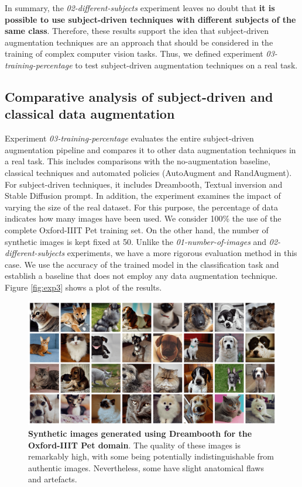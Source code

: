 In summary, the \textit{02-different-subjects} experiment leaves no doubt that \textbf{it is possible to use subject-driven techniques with different subjects of the same class}. Therefore, these results support the idea that subject-driven augmentation techniques are an approach that should be considered in the training of complex computer vision tasks. Thus, we defined experiment \textit{03-training-percentage} to test subject-driven augmentation techniques on a real task.

\subsection{Comparative analysis of subject-driven and classical data augmentation} \label{sec: exp-03}

Experiment \textit{03-training-percentage} evaluates the entire subject-driven augmentation pipeline and compares it to other data augmentation techniques in a real task. This includes comparisons with the no-augmentation baseline, classical techniques and automated policies (AutoAugment and RandAugment). For subject-driven techniques, it includes Dreambooth, Textual inversion and Stable Diffusion prompt. In addition, the experiment examines the impact of varying the size of the real dataset. For this purpose, the percentage of data indicates how many images have been used. We consider 100\% the use of the complete Oxford-IIIT Pet training set. On the other hand, the number of synthetic images is kept fixed at 50. Unlike the \textit{01-number-of-images} and \textit{02-different-subjects} experiments, we have a more rigorous evaluation method in this case. We use the accuracy of the trained model in the classification task and establish a baseline that does not employ any data augmentation technique. Figure \ref{fig:exp3} shows a plot of the results. 

\begin{figure}
    \centering
    \includegraphics[width=1\textwidth]{Pictures/dreambooth-img.png} 
    \caption{\textbf{Synthetic images generated using Dreambooth for the Oxford-IIIT Pet domain}. The quality of these images is remarkably high, with some being potentially indistinguishable from authentic images. Nevertheless, some have slight anatomical flaws and artefacts.}
    \label{fig:exp3-images-dream}
\end{figure}

